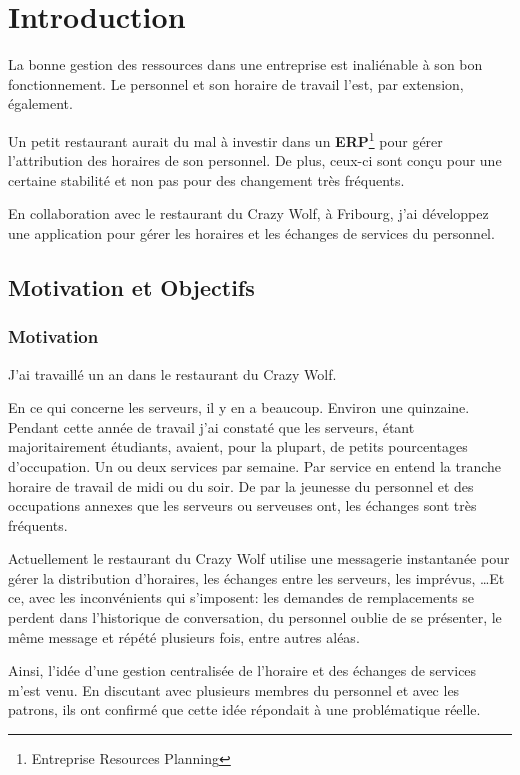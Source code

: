 \chapter[Introduction]{Introduction}

La bonne gestion des ressources dans une entreprise est inaliénable à son bon fonctionnement. Le personnel et son horaire de travail l'est, par extension, également. 

Un petit restaurant aurait du mal à investir dans un \textbf{ERP}\footnote{Entreprise Resources Planning} pour gérer l'attribution des horaires de son personnel. De plus, ceux-ci sont conçu pour une certaine stabilité et non pas pour des changement très fréquents.

En collaboration avec le restaurant du Crazy Wolf, à Fribourg, j'ai développez une application pour gérer les horaires et les échanges de services du personnel.

\section[Motivations et objectifs]{Motivation et Objectifs}

\subsection*{Motivation}
J'ai travaillé un an dans le restaurant du Crazy Wolf.

En ce qui concerne les serveurs, il y en a beaucoup. Environ une quinzaine. Pendant cette année de travail j'ai constaté que les serveurs, étant majoritairement étudiants, avaient, pour la plupart, de petits pourcentages d'occupation. Un ou deux services par semaine. Par service en entend la tranche horaire de travail de midi ou du soir. 
De par la jeunesse du personnel et des occupations annexes que les serveurs ou serveuses ont, les échanges sont très fréquents. 

Actuellement le restaurant du Crazy Wolf utilise une messagerie instantanée pour gérer la distribution d'horaires, les échanges entre les serveurs, les imprévus, \dots Et ce, avec les inconvénients qui s'imposent: les demandes de remplacements se perdent dans l'historique de conversation, du personnel oublie de se présenter, le même message et répété plusieurs fois, entre autres aléas.

Ainsi, l'idée d'une gestion centralisée de l'horaire et des échanges de services m'est venu. En discutant avec plusieurs membres du personnel et avec les patrons, ils ont confirmé que cette idée répondait à une problématique réelle. 

